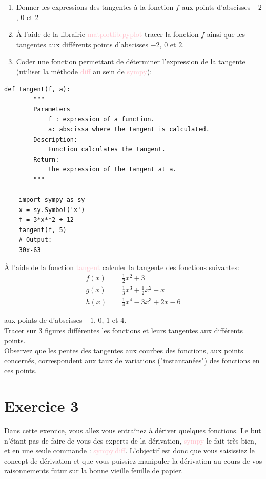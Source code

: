 \documentclass[11pt, french]{article}
\newcommand{\inlsnippet}[1]{\colorbox{gray!10}{\mbox{\textcolor{pink}{#1}}}}
\begin{document}
\begin{enumerate}
    \item Donner les expressions des tangentes à la fonction $f$ aux points d'abscisses $-2$, $0$ et $2$\\
    \item À l'aide de la librairie \inlsnippet{matplotlib.pyplot} tracer la fonction $f$ ainsi que les tangentes aux différents points d'abscisses $-2$, $0$ et $2$.
    \item Coder une fonction permettant de déterminer l'expression de la tangente (utiliser la méthode \inlsnippet{diff} au sein de \inlsnippet{sympy}):
\end{enumerate}

\begin{lstlisting}[style=nightly]
    def tangent(f, a):
        """
        Parameters
            f : expression of a function.
            a: abscissa where the tangent is calculated.
        Description:
            Function calculates the tangent.
        Return:
            the expression of the tangent at a.
        """
    
    import sympy as sy
    x = sy.Symbol('x')
    f = 3*x**2 + 12
    tangent(f, 5)
    # Output:
    30x-63
\end{lstlisting}

À l'aide de la fonction \inlsnippet{tangent} calculer la tangente des fonctions suivantes:
\begin{align*}
   f(x) =& \frac{1}{2}x^2 + 3 \\
   g(x) =& \frac{1}{3}x^3 + \frac{1}{2}x^2 + x \\
   h(x) =& \frac{1}{4}x^4 - 3x^3 + 2x  -6 
\end{align*}

aux points de d'abscisses $-1$, $0$, $1$ et $4$.\\
Tracer sur 3 figures différentes les fonctions et leurs tangentes aux différents points.\\
Observez que les pentes des tangentes aux courbes des fonctions, aux points concernés, correspondent aux taux de variations ("instantanées") des fonctions en ces points.
\vspace{1cm}

\section*{Exercice 3}
Dans cette exercice, vous allez vous entraînez à dériver quelques fonctions.
Le but n'étant pas de faire de vous des experts de la dérivation, \inlsnippet{sympy} le fait très bien, et en une seule commande : \inlsnippet{sympy.diff}. L'objectif est donc que vous saisissiez le concept de dérivation et que vous puissiez manipuler la dérivation au cours de vos raisonnements futur sur la bonne vieille feuille de papier.
\end{document}
